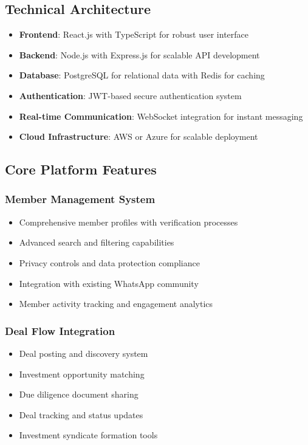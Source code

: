 \subsection{Technical Architecture}
\begin{itemize}
    \item \textbf{Frontend}: React.js with TypeScript for robust user interface
    \item \textbf{Backend}: Node.js with Express.js for scalable API development
    \item \textbf{Database}: PostgreSQL for relational data with Redis for caching
    \item \textbf{Authentication}: JWT-based secure authentication system
    \item \textbf{Real-time Communication}: WebSocket integration for instant messaging
    \item \textbf{Cloud Infrastructure}: AWS or Azure for scalable deployment
\end{itemize}

\subsection{Core Platform Features}
\subsubsection{Member Management System}
\begin{itemize}
    \item Comprehensive member profiles with verification processes
    \item Advanced search and filtering capabilities
    \item Privacy controls and data protection compliance
    \item Integration with existing WhatsApp community
    \item Member activity tracking and engagement analytics
\end{itemize}

\subsubsection{Deal Flow Integration}
\begin{itemize}
    \item Deal posting and discovery system
    \item Investment opportunity matching
    \item Due diligence document sharing
    \item Deal tracking and status updates
    \item Investment syndicate formation tools
\end{itemize}

